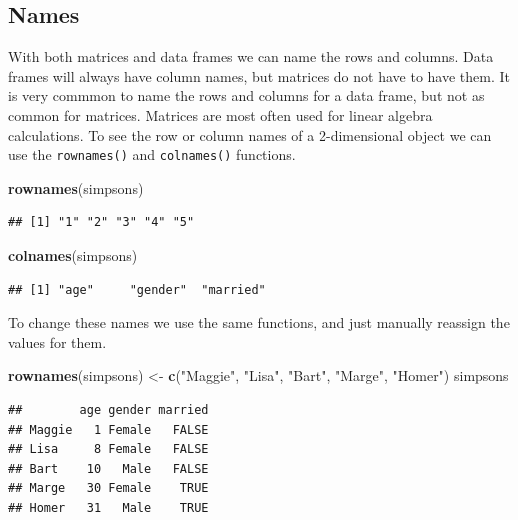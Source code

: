 \documentclass[
]{book}
\newenvironment{Shaded}{\begin{snugshade}}{\end{snugshade}}
\newcommand{\KeywordTok}[1]{\textcolor[rgb]{0.13,0.29,0.53}{\textbf{#1}}}
\newcommand{\NormalTok}[1]{#1}
\newcommand{\StringTok}[1]{\textcolor[rgb]{0.31,0.60,0.02}{#1}}
\begin{document}
\hypertarget{names-3}{%
\subsection{Names}\label{names-3}}

With both matrices and data frames we can name the rows and columns. Data frames will always have column names, but matrices do not have to have them. It is very commmon to name the rows and columns for a data frame, but not as common for matrices. Matrices are most often used for linear algebra calculations. To see the row or column names of a 2-dimensional object we can use the \texttt{rownames()} and \texttt{colnames()} functions.

\begin{Shaded}
\begin{Highlighting}[]
\KeywordTok{rownames}\NormalTok{(simpsons)}
\end{Highlighting}
\end{Shaded}

\begin{verbatim}
## [1] "1" "2" "3" "4" "5"
\end{verbatim}

\begin{Shaded}
\begin{Highlighting}[]
\KeywordTok{colnames}\NormalTok{(simpsons)}
\end{Highlighting}
\end{Shaded}

\begin{verbatim}
## [1] "age"     "gender"  "married"
\end{verbatim}

To change these names we use the same functions, and just manually reassign the values for them.

\begin{Shaded}
\begin{Highlighting}[]
\KeywordTok{rownames}\NormalTok{(simpsons) <-}\StringTok{ }\KeywordTok{c}\NormalTok{(}\StringTok{"Maggie"}\NormalTok{, }\StringTok{"Lisa"}\NormalTok{, }\StringTok{"Bart"}\NormalTok{, }\StringTok{"Marge"}\NormalTok{, }\StringTok{"Homer"}\NormalTok{)}
\NormalTok{simpsons}
\end{Highlighting}
\end{Shaded}

\begin{verbatim}
##        age gender married
## Maggie   1 Female   FALSE
## Lisa     8 Female   FALSE
## Bart    10   Male   FALSE
## Marge   30 Female    TRUE
## Homer   31   Male    TRUE
\end{verbatim}
\end{document}
